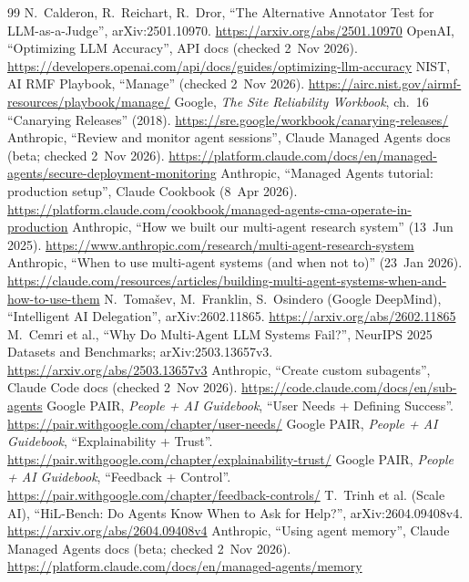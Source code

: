 \documentclass[10pt]{article}
\begin{document}
\begin{thebibliography}{99}
 N.~Calderon, R.~Reichart, R.~Dror, ``The Alternative Annotator Test for LLM-as-a-Judge'', arXiv:2501.10970. \url{https://arxiv.org/abs/2501.10970}
 OpenAI, ``Optimizing LLM Accuracy'', API docs (checked 2~Nov 2026). \url{https://developers.openai.com/api/docs/guides/optimizing-llm-accuracy}
 NIST, AI RMF Playbook, ``Manage'' (checked 2~Nov 2026). \url{https://airc.nist.gov/airmf-resources/playbook/manage/}
 Google, \emph{The Site Reliability Workbook}, ch.~16 ``Canarying Releases'' (2018). \url{https://sre.google/workbook/canarying-releases/}
 Anthropic, ``Review and monitor agent sessions'', Claude Managed Agents docs (beta; checked 2~Nov 2026). \url{https://platform.claude.com/docs/en/managed-agents/secure-deployment-monitoring}
 Anthropic, ``Managed Agents tutorial: production setup'', Claude Cookbook (8~Apr 2026). \url{https://platform.claude.com/cookbook/managed-agents-cma-operate-in-production}
 Anthropic, ``How we built our multi-agent research system'' (13~Jun 2025). \url{https://www.anthropic.com/research/multi-agent-research-system}
 Anthropic, ``When to use multi-agent systems (and when not to)'' (23~Jan 2026). \url{https://claude.com/resources/articles/building-multi-agent-systems-when-and-how-to-use-them}
 N.~Toma\v{s}ev, M.~Franklin, S.~Osindero (Google DeepMind), ``Intelligent AI Delegation'', arXiv:2602.11865. \url{https://arxiv.org/abs/2602.11865}
 M.~Cemri et al., ``Why Do Multi-Agent LLM Systems Fail?'', NeurIPS 2025 Datasets and Benchmarks; arXiv:2503.13657v3. \url{https://arxiv.org/abs/2503.13657v3}
 Anthropic, ``Create custom subagents'', Claude Code docs (checked 2~Nov 2026). \url{https://code.claude.com/docs/en/sub-agents}
 Google PAIR, \emph{People + AI Guidebook}, ``User Needs + Defining Success''. \url{https://pair.withgoogle.com/chapter/user-needs/}
 Google PAIR, \emph{People + AI Guidebook}, ``Explainability + Trust''. \url{https://pair.withgoogle.com/chapter/explainability-trust/}
 Google PAIR, \emph{People + AI Guidebook}, ``Feedback + Control''. \url{https://pair.withgoogle.com/chapter/feedback-controls/}
 T.~Trinh et al. (Scale AI), ``HiL-Bench: Do Agents Know When to Ask for Help?'', arXiv:2604.09408v4. \url{https://arxiv.org/abs/2604.09408v4}
 Anthropic, ``Using agent memory'', Claude Managed Agents docs (beta; checked 2~Nov 2026). \url{https://platform.claude.com/docs/en/managed-agents/memory}

\end{thebibliography}
\end{document}
